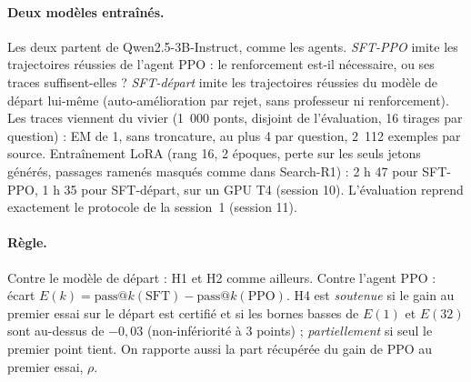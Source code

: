 \documentclass[11pt,a4paper]{article}
\begin{document}
\paragraph{Deux modèles entraînés.} Les deux partent de Qwen2.5-3B-Instruct, comme les agents. \emph{SFT-PPO} imite les trajectoires réussies de l'agent PPO : le renforcement est-il nécessaire, ou ses traces suffisent-elles ? \emph{SFT-départ} imite les trajectoires réussies du modèle de départ lui-même (auto-amélioration par rejet, sans professeur ni renforcement). Les traces viennent du vivier (1~000 ponts, disjoint de l'évaluation, 16 tirages par question) : EM de 1, sans troncature, au plus 4 par question, 2~112 exemples par source. Entraînement LoRA (rang 16, 2 époques, perte sur les seuls jetons générés, passages ramenés masqués comme dans Search-R1) : 2 h 47 pour SFT-PPO, 1 h 35 pour SFT-départ, sur un GPU T4 (session 10). L'évaluation reprend exactement le protocole de la session~1 (session 11).

\paragraph{Règle.} Contre le modèle de départ : H1 et H2 comme ailleurs. Contre l'agent PPO : écart $E(k) = \text{pass@}k(\text{SFT}) - \text{pass@}k(\text{PPO})$. H4 est \emph{soutenue} si le gain au premier essai sur le départ est certifié et si les bornes basses de $E(1)$ et $E(32)$ sont au-dessus de $-0{,}03$ (non-infériorité à 3 points) ; \emph{partiellement} si seul le premier point tient. On rapporte aussi la part récupérée du gain de PPO au premier essai, $\rho$.

\begin{table}[h]\centering\small
{}
\caption{H4 (amendement du 23 novembre) : fine-tuning supervisé sur des trajectoires réussies, 500 ponts, 32 tirages, IC à 95~\% par bootstrap des questions. $\rho$ : part du gain de PPO au premier essai récupérée. Verdict H4 : soutenue (SFT-PPO), partiellement (SFT-départ).}\label{tab:h4-p2}
\end{table}
\end{document}
